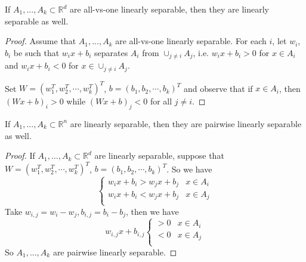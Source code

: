 \begin{lemma}
  If $A_1,...,A_k\subset \mathbb{R}^d$ are all-vs-one linearly
  separable, then they are linearly separable as well.
\end{lemma}
\begin{proof}
 Assume that $A_1,...,A_k$ are all-vs-one linearly separable. For each $i$, let $w_i$, $b_i$ be such that $w_ix + b_i$ separates
 $A_i$ from $\cup_{j\neq i} A_j$, i.e. $w_ix + b_i > 0$ for $x\in A_i$ and $w_ix + b_i < 0$ for $x \in \cup_{j\neq i} A_j$.
 
 Set $W = (w_1^T,w_2^T,\cdots,w_k^T)^T$, $b = (b_1,b_2,\cdots,b_k)^T$ and observe that if $x\in A_i$, then
 $(Wx + b)_i > 0$ while $(Wx + b)_j < 0$ for all $j\neq i$.
\end{proof}

\begin{lemma}
  If $A_1,...,A_k\subset \mathbb{R}^n$ are linearly separable, then
  they are pairwise linearly separable as well.
\end{lemma}

\begin{proof}
  If $A_1,...,A_k\subset \mathbb{R}^d$ are linearly separable, suppose
  that $W = (w_1^T,w_2^T,\cdots,w_k^T)^T$, $b =
  (b_1,b_2,\cdots,b_k)^T$. So we have
	\begin{equation}
	\begin{cases} 
	w_i x+ b_i > w_j x + b_j & x\in A_i \\
	w_i x+ b_i < w_j x + b_j& x\in A_j \\
	\end{cases}
	\end{equation}
	Take $w_{i,j} = w_i - w_j, b_{i,j} = b_i-b_j$, then we have 
	\begin{equation}
	w_{i,j}x + b_{i,j}\begin{cases} 
	> 0 & x\in A_i \\
	< 0 & x\in A_j \\
	\end{cases}
	\end{equation}
	So $A_1,...,A_k$ are pairwise linearly separable.
\end{proof}

